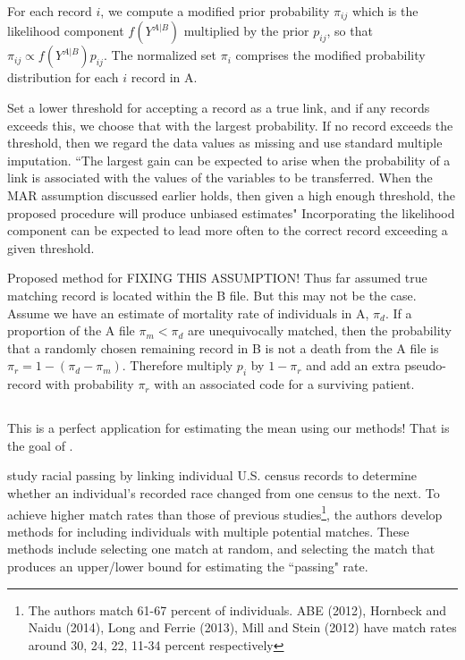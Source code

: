 \documentclass[12pt]{article}
\begin{document}
For each record $i$, we compute a modified prior probability $\pi_{ij}$ which is the likelihood component $f(Y^{A|B})$ multiplied by the prior $p_{ij}$, so that $\pi_{ij} \propto f(Y^{A|B}) p_{ij}$.  The normalized set $\pi_i$ comprises the modified probability distribution for each $i$ record in A.  

Set a lower threshold for accepting a record as a true link, and if any records exceeds this, we choose that with the largest probability.  If no record exceeds the threshold, then we regard the data values as missing and use standard multiple imputation.  ``The largest gain can be expected to arise
when the probability of a link is associated with the values of the variables to be transferred. When the
MAR assumption discussed earlier holds, then given a high enough threshold, the proposed procedure
will produce unbiased estimates" Incorporating the likelihood component can be expected to lead more often to the correct record exceeding a given threshold. 

Proposed method for FIXING THIS ASSUMPTION! Thus far assumed true matching record is located within the B file.  But this may not be the case. Assume we have an estimate of mortality rate of individuals in A, $\pi_d$.  If a proportion of the A file $\pi_m < \pi_d$ are unequivocally matched, then the probability that a randomly chosen remaining record in B is not a death from the A file is $\pi_r = 1 - (\pi_d - \pi_m)$.  Therefore multiply $p_i$ by $1-\pi_r$ and add an extra pseudo-record with probability $\pi_r$ with an associated code for a surviving patient. 




\subsection{\cite{nq2015}}


This is a perfect application for estimating the mean using our methods! That is the goal of \cite{nq2015}. 

\cite{nq2015} study racial passing by linking individual U.S. census records to determine whether an individual's recorded race changed from one census to the next.  To achieve higher match rates than those of previous studies\footnote{The authors match 61-67 percent of individuals.   ABE (2012), Hornbeck and Naidu (2014), Long and Ferrie (2013), Mill and Stein (2012)
have match rates around 30, 24, 22, 11-34 percent respectively}, the authors develop methods for including individuals with multiple potential matches.  These methods include selecting one match at random, and selecting the match that produces an upper/lower bound for estimating the ``passing" rate.  
\end{document}
